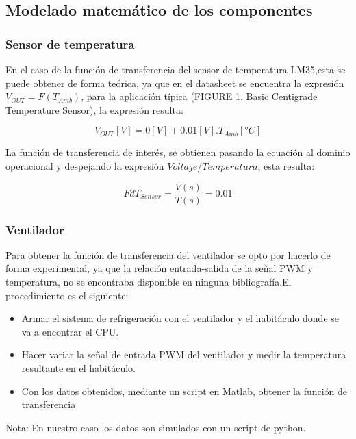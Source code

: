 \documentclass[12pt]{article}
\begin{document}
	\subsection{Modelado matemático de los componentes}
	
		\subsubsection{Sensor de temperatura}
		En el caso de la función de transferencia del sensor de temperatura LM35,esta se puede obtener de forma teórica, ya que en el datasheet se encuentra la expresión $V_{OUT}=F(T_{Amb})$, para la aplicación típica (FIGURE 1. Basic Centigrade Temperature Sensor), la expresión resulta:
		
		\begin{equation}
			V_{OUT}[V]= 0[V]+0.01[V].T_{Amb}[°C]
		\end{equation}
		
		La función de transferencia de interés, se obtienen pasando la ecuación al dominio operacional y despejando la expresión $Voltaje/Temperatura$, esta resulta:
		
		\begin{equation}
			FdT_{Sensor}=\frac{V(s)}{T(s)}=0.01
		\end{equation}
		
		\subsubsection{Ventilador}
		Para obtener la función de transferencia del ventilador se opto por hacerlo de forma experimental, ya que la relación entrada-salida de la señal PWM y temperatura, no se encontraba disponible en ninguna bibliografía.El procedimiento es el siguiente:
		\begin{itemize}
			\item Armar el sistema de refrigeración con el ventilador y el habitáculo donde se va a encontrar el CPU.
			\item Hacer variar la señal de entrada PWM del ventilador y medir la temperatura resultante en el habitáculo.
			\item Con los datos obtenidos, mediante un script en Matlab, obtener la función de transferencia
		\end{itemize}
		
		Nota: En nuestro caso los datos son simulados con un script de python.\newpage
		
\end{document}
